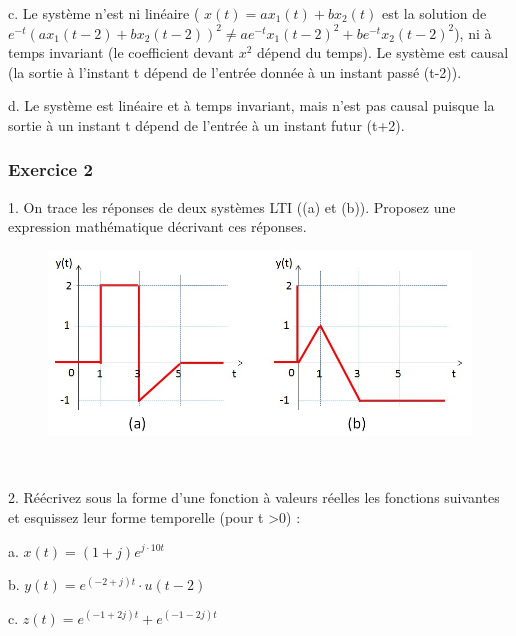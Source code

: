 \documentclass[11pt]{report}
\begin{document}
 	\vspace{0.5\baselineskip}
 	c. Le système n'est ni linéaire ( $x(t)= ax_{1}(t)+bx_{2}(t)$ est la solution de $e^{-t}(ax_{1}(t-2)+bx_{2}(t-2))^{2} \neq ae^{-t}x_{1}(t-2)^{2}+be^{-t}x_{2}(t-2)^{2}$), ni à temps invariant (le coefficient devant $x^{2}$ dépend du temps). Le système est causal (la sortie à l'instant t dépend de l'entrée donnée à un instant passé (t-2)).
 	
 	\vspace{0.5\baselineskip}
 	d. Le système est linéaire et à temps invariant, mais n'est pas causal puisque la sortie à un instant t dépend de l'entrée à un instant futur (t+2).
 	
 	\vspace{1\baselineskip}
 	
 	
 	\subsubsection{Exercice 2} 
 	1. On trace les réponses de deux systèmes LTI ((a) et (b)). Proposez une expression mathématique décrivant ces réponses.
 	\begin{figure}[h!]
 		\centering
 		\includegraphics[scale=0.5]{images/Exo_2_2.jpg} 
 	\end{figure} \\
 
 	\vspace{0.5\baselineskip}
 	
 	2. Réécrivez sous la forme d'une fonction à valeurs réelles les fonctions suivantes et esquissez leur forme temporelle (pour t >0) :
 	
 	a. $x(t) = (1+j)e^{j\cdot 10t}$ 
 	
 	b. $y(t) = e^{(-2+j)t}\cdot u(t-2)$ 
 	
 	c. $z(t) = e^{(-1+2j)t}+e^{(-1-2j)t}$
 	
 	\vspace{1\baselineskip}	
 	
\end{document}
